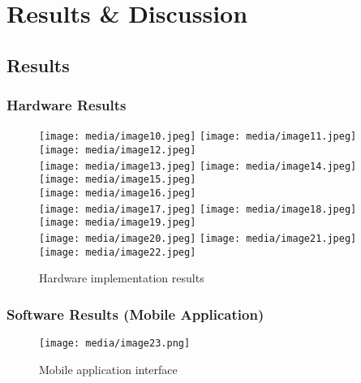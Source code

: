 \documentclass[12pt]{report}
\begin{document}
\chapter{Results \& Discussion}
\section{Results}
\subsection{Hardware Results}
\begin{figure}[ht]
    \centering
    \texttt{[image: media/image10.jpeg]}
    \texttt{[image: media/image11.jpeg]}
    \texttt{[image: media/image12.jpeg]}\\
    \texttt{[image: media/image13.jpeg]}
    \texttt{[image: media/image14.jpeg]}
    \texttt{[image: media/image15.jpeg]}\\
    \texttt{[image: media/image16.jpeg]}\\
    \texttt{[image: media/image17.jpeg]}
    \texttt{[image: media/image18.jpeg]}
    \texttt{[image: media/image19.jpeg]}\\
    \texttt{[image: media/image20.jpeg]}
    \texttt{[image: media/image21.jpeg]}
    \texttt{[image: media/image22.jpeg]}
    \caption{Hardware implementation results}
    \label{fig:hardware_results}
\end{figure}

\subsection{Software Results (Mobile Application)}
\begin{figure}[ht]
    \centering
    \texttt{[image: media/image23.png]}
    \caption{Mobile application interface}
    \label{fig:mobile_app}
\end{figure}
\end{document}
